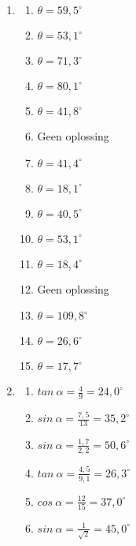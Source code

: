  \begin{solutions}{}{
\begin{enumerate}[itemsep=5pt, label=\textbf{\arabic*}. ] 


\item 
\begin{multicols}{2}
    \begin{enumerate}[noitemsep, label=\textbf{(\alph*)} ]
\item $\theta = 59,5^{\circ}$%
\item $\theta =53,1^{\circ}$%
\item $\theta =71,3^{\circ}$%
\item $\theta =80,1^{\circ}$%
\item $\theta =41,8^{\circ}$%
\item Geen oplossing%
\item $\theta =41,4^{\circ}$%
\item $\theta =18,1^{\circ}$%
\item $\theta =40,5^{\circ}$%
\item $\theta =53,1^{\circ}$%
\item $\theta =18,4^{\circ}$%
\item Geen oplossing%
\item $\theta =109,8^{\circ}$%
\item $\theta =26,6^{\circ}$%
\item $\theta =17,7^{\circ}$%
\end{enumerate}
\end{multicols}
\item 
\begin{multicols}{2}
    \begin{enumerate}[noitemsep, label=\textbf{(\alph*)} ]
\item $tan~ \alpha = \frac{4}{9}=24,0^{\circ}$
\item $sin~\alpha = \frac{7,5}{13}=35,2^{\circ}$
\item $sin~\alpha= \frac{1,7}{2,2}=50,6^{\circ}$
\item $tan~\alpha=\frac{4,5}{9,1}=26,3^{\circ}$
\item $cos~\alpha=\frac{12}{15}=37,0^{\circ}$
\item $sin~\alpha=\frac{1}{\sqrt{2}}=45,0^{\circ}$
      \end{enumerate}
\end{multicols}
\end{enumerate}}
\end{solutions}


